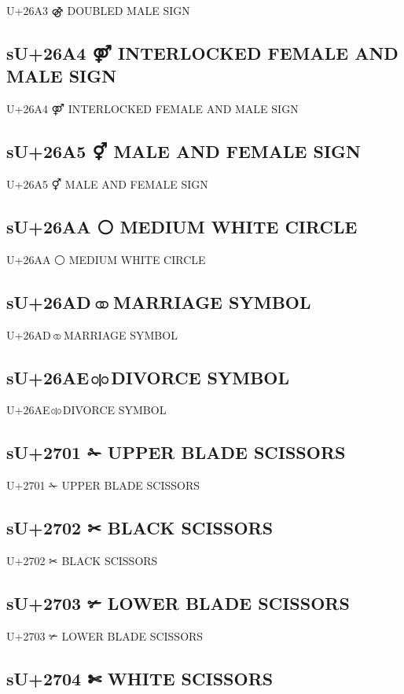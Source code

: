 U+26A3 ⚣ DOUBLED MALE SIGN

\subsection{sU+26A4 ⚤ INTERLOCKED FEMALE AND MALE SIGN}

U+26A4 ⚤ INTERLOCKED FEMALE AND MALE SIGN

\subsection{sU+26A5 ⚥ MALE AND FEMALE SIGN}

U+26A5 ⚥ MALE AND FEMALE SIGN

\subsection{sU+26AA ⚪ MEDIUM WHITE CIRCLE}

U+26AA ⚪ MEDIUM WHITE CIRCLE

\subsection{sU+26AD ⚭ MARRIAGE SYMBOL}

U+26AD ⚭ MARRIAGE SYMBOL

\subsection{sU+26AE ⚮ DIVORCE SYMBOL}

U+26AE ⚮ DIVORCE SYMBOL

\subsection{sU+2701 ✁ UPPER BLADE SCISSORS}

U+2701 ✁ UPPER BLADE SCISSORS

\subsection{sU+2702 ✂ BLACK SCISSORS}

U+2702 ✂ BLACK SCISSORS

\subsection{sU+2703 ✃ LOWER BLADE SCISSORS}

U+2703 ✃ LOWER BLADE SCISSORS

\subsection{sU+2704 ✄ WHITE SCISSORS}

